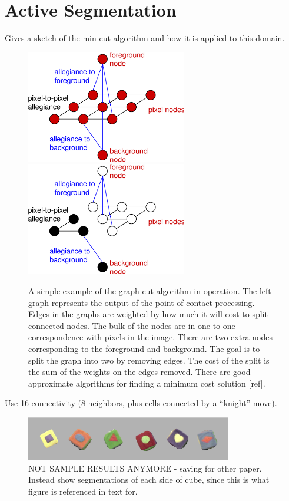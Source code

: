 
\ifverbose

\section{Active Segmentation}

Gives a sketch of the min-cut algorithm and how it is applied to
this domain.

\begin{figure}[tbh]
\begin{center}
\includegraphics[width=7cm]{cut-graph1.eps}
\hspace{1cm}
\includegraphics[width=7cm]{cut-graph2.eps}
\caption{ 
\label{fig:cut-graph}
%
A simple example of the graph cut algorithm in operation.  
The left graph represents the output of the point-of-contact 
processing.  Edges in the graphs are weighted by how much
it will cost to split connected nodes.  The bulk of the nodes
are in one-to-one correspondence with pixels in the image.
There are two extra nodes corresponding to the foreground and
background.  The goal is to split the graph into two by removing
edges.  The cost of the split is the sum of the weights on the 
edges removed.  There are good approximate algorithms for
finding a minimum cost solution [ref].
%
}
\end{center}
\end{figure}

Use 16-connectivity (8 neighbors, plus cells connected by a
``knight'' move).

\fi

\begin{figure}[tbh]
  \centerline{\includegraphics[width=9cm]{fig-cube-segmentations}}
  \caption{
%
NOT SAMPLE RESULTS ANYMORE - saving for other paper.
Instead show segmentations of each side of cube, since this is
what figure is referenced in text for.
%
}
  \label{fig:sample-results}
\end{figure}


